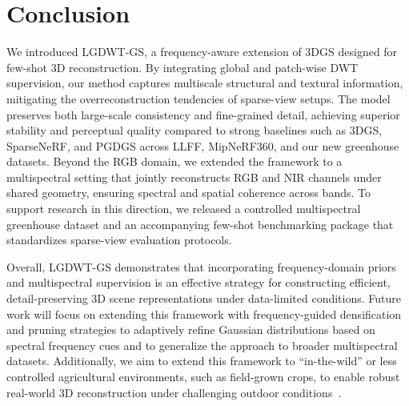 
\section{Conclusion}
\label{sec:conclusion}

We introduced LGDWT-GS, a frequency-aware extension of 3DGS designed for few-shot 3D reconstruction. By integrating global and patch-wise DWT supervision, our method captures multiscale structural and textural information, mitigating the overreconstruction tendencies of sparse-view setups. The model preserves both large-scale consistency and fine-grained detail, achieving superior stability and perceptual quality compared to strong baselines such as 3DGS, SparseNeRF, and PGDGS across LLFF, MipNeRF360, and our new greenhouse datasets. Beyond the RGB domain, we extended the framework to a multispectral setting that jointly reconstructs RGB and NIR channels under shared geometry, ensuring spectral and spatial coherence across bands. To support research in this direction, we released a controlled multispectral greenhouse dataset and an accompanying few-shot benchmarking package that standardizes sparse-view evaluation protocols.

Overall, LGDWT-GS demonstrates that incorporating frequency-domain priors and multispectral supervision is an effective strategy for constructing efficient, detail-preserving 3D scene representations under data-limited conditions. Future work will focus on extending this framework with frequency-guided densification and pruning strategies to adaptively refine Gaussian distributions based on spectral frequency cues and to generalize the approach to broader multispectral datasets. Additionally, we aim to extend this framework to “in-the-wild” or less controlled agricultural environments, such as field-grown crops, to enable robust real-world 3D reconstruction under challenging outdoor conditions~\cite{zhang2025wheat3dgs}.



